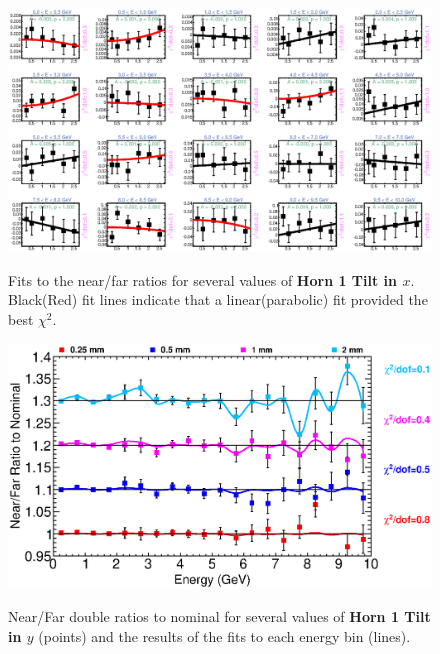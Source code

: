 {\begin{figure}[ht]
  \begin{center}
    {\includegraphics[width=5.0in]{figures/Horn1XTilt_nof_fits.eps}}
  \end{center}
\caption{ Fits to the near/far ratios for several values of {\bf Horn 1 Tilt in $x$}. Black(Red) fit lines indicate that a linear(parabolic) fit provided the best $\chi^2$. }
\end{figure}

\begin{figure}[ht]
  \begin{center}
    {\includegraphics[width=6.0in]{figures/Horn1YTilt_nof_summary.eps}}
  \end{center}
\caption{ Near/Far double ratios to nominal for several values of {\bf Horn 1 Tilt in $y$} (points) and the results of the fits to each energy bin (lines).}
\end{figure}

\clearpage

}
